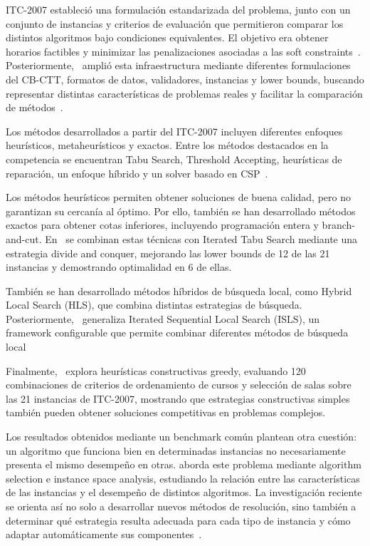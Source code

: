 \documentclass[letter, 10pt]{article}
\begin{document}
ITC-2007 estableci\'o una formulaci\'on estandarizada del problema, junto con un conjunto de instancias y criterios de evaluaci\'on que permitieron comparar los distintos algoritmos bajo condiciones equivalentes. El objetivo era obtener horarios factibles y minimizar las penalizaciones asociadas a las soft constraints~\cite{DiGaspero2007ITC}. Posteriormente,~\cite{Bonutti2012Benchmarking} ampli\'o esta infraestructura mediante diferentes formulaciones del CB-CTT, formatos de datos, validadores, instancias y lower bounds, buscando representar distintas caracter\'isticas de problemas reales y facilitar la comparaci\'on de m\'etodos~\cite{Bonutti2012Benchmarking}.

Los m\'etodos desarrollados a partir del ITC-2007 incluyen diferentes enfoques heur\'isticos, metaheur\'isticos y exactos. Entre los m\'etodos destacados en la competencia se encuentran Tabu Search, Threshold Accepting, heur\'isticas de reparaci\'on, un enfoque h\'ibrido y un solver basado en CSP~\cite{Ceschia2023Educational}.

Los m\'etodos heur\'isticos permiten obtener soluciones de buena calidad, pero no garantizan su cercan\'ia al \'optimo. Por ello, tambi\'en se han desarrollado m\'etodos exactos para obtener cotas inferiores, incluyendo programaci\'on entera y branch-and-cut. En~\cite{Hao2011LowerBounds} se combinan estas t\'ecnicas con Iterated Tabu Search mediante una estrategia divide and conquer, mejorando las lower bounds de 12 de las 21 instancias y demostrando optimalidad en 6 de ellas.

Tambi\'en se han desarrollado m\'etodos h\'ibridos de b\'usqueda local, como Hybrid Local Search (HLS), que combina distintas estrategias de b\'usqueda. Posteriormente,~\cite{Feutrier2023Landscape} generaliza Iterated Sequential Local Search (ISLS), un framework configurable que permite combinar diferentes m\'etodos de b\'usqueda local

Finalmente,~\cite{Cosar2022Greedy} explora heur\'isticas constructivas greedy, evaluando 120 combinaciones de criterios de ordenamiento de cursos y selecci\'on de salas sobre las 21 instancias de ITC-2007, mostrando que estrategias constructivas simples tambi\'en pueden obtener soluciones competitivas en problemas complejos.

Los resultados obtenidos mediante un benchmark com\'un plantean otra cuesti\'on: un algoritmo que funciona bien en determinadas instancias no necesariamente presenta el mismo desempe\~no en otras. \cite{DeCoster2022AlgorithmSelection} aborda este problema mediante algorithm selection e instance space analysis, estudiando la relaci\'on entre las caracter\'isticas de las instancias y el desempe\~no de distintos algoritmos. La investigaci\'on reciente se orienta as\'i no solo a desarrollar nuevos m\'etodos de resoluci\'on, sino tambi\'en a determinar qu\'e estrategia resulta adecuada para cada tipo de instancia y c\'omo adaptar autom\'aticamente sus componentes~\cite{Feutrier2023Landscape,DeCoster2022AlgorithmSelection}.
\end{document}
